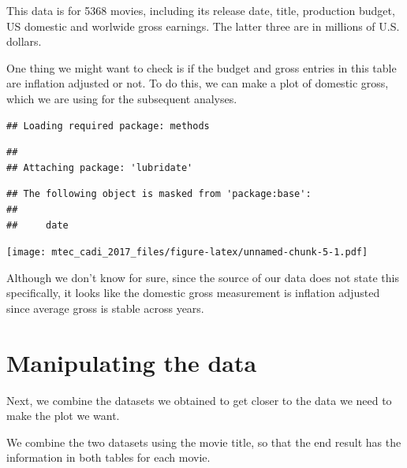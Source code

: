 \documentclass[]{book}
\theoremstyle{definition}
\theoremstyle{definition}
\theoremstyle{remark}
\begin{document}
This data is for 5368 movies, including its release date, title,
production budget, US domestic and worlwide gross earnings. The latter
three are in millions of U.S. dollars.

One thing we might want to check is if the budget and gross entries in
this table are inflation adjusted or not. To do this, we can make a plot
of domestic gross, which we are using for the subsequent analyses.

\begin{verbatim}
## Loading required package: methods
\end{verbatim}

\begin{verbatim}
## 
## Attaching package: 'lubridate'
\end{verbatim}

\begin{verbatim}
## The following object is masked from 'package:base':
## 
##     date
\end{verbatim}

\texttt{[image: mtec\_cadi\_2017\_files/figure-latex/unnamed-chunk-5-1.pdf]}

Although we don't know for sure, since the source of our data does not
state this specifically, it looks like the domestic gross measurement is
inflation adjusted since average gross is stable across years.

\section{Manipulating the data}\label{manipulating-the-data}

Next, we combine the datasets we obtained to get closer to the data we
need to make the plot we want.

We combine the two datasets using the movie title, so that the end
result has the information in both tables for each movie.
\end{document}
